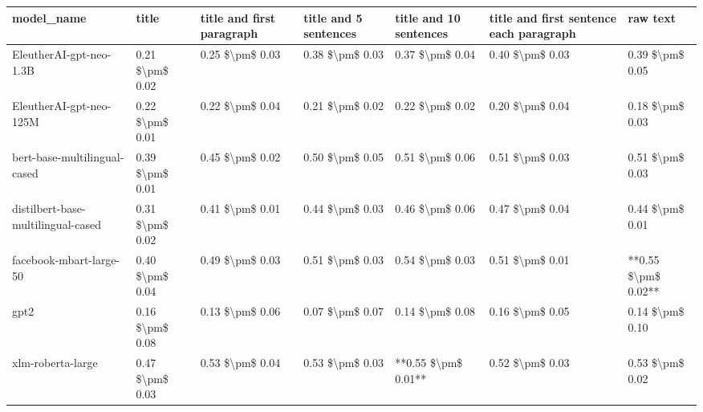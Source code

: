\begin{tabular}{lllllll}
\toprule
                        model\_name &           title & title and first paragraph & title and 5 sentences & title and 10 sentences & title and first sentence each paragraph &            raw text \\
\midrule
           EleutherAI-gpt-neo-1.3B & 0.21 \$\textbackslash pm\$ 0.02 &           0.25 \$\textbackslash pm\$ 0.03 &       0.38 \$\textbackslash pm\$ 0.03 &        0.37 \$\textbackslash pm\$ 0.04 &                         0.40 \$\textbackslash pm\$ 0.03 &     0.39 \$\textbackslash pm\$ 0.05 \\
           EleutherAI-gpt-neo-125M & 0.22 \$\textbackslash pm\$ 0.01 &           0.22 \$\textbackslash pm\$ 0.04 &       0.21 \$\textbackslash pm\$ 0.02 &        0.22 \$\textbackslash pm\$ 0.02 &                         0.20 \$\textbackslash pm\$ 0.04 &     0.18 \$\textbackslash pm\$ 0.03 \\
      bert-base-multilingual-cased & 0.39 \$\textbackslash pm\$ 0.01 &           0.45 \$\textbackslash pm\$ 0.02 &       0.50 \$\textbackslash pm\$ 0.05 &        0.51 \$\textbackslash pm\$ 0.06 &                         0.51 \$\textbackslash pm\$ 0.03 &     0.51 \$\textbackslash pm\$ 0.03 \\
distilbert-base-multilingual-cased & 0.31 \$\textbackslash pm\$ 0.02 &           0.41 \$\textbackslash pm\$ 0.01 &       0.44 \$\textbackslash pm\$ 0.03 &        0.46 \$\textbackslash pm\$ 0.06 &                         0.47 \$\textbackslash pm\$ 0.04 &     0.44 \$\textbackslash pm\$ 0.01 \\
           facebook-mbart-large-50 & 0.40 \$\textbackslash pm\$ 0.04 &           0.49 \$\textbackslash pm\$ 0.03 &       0.51 \$\textbackslash pm\$ 0.03 &        0.54 \$\textbackslash pm\$ 0.03 &                         0.51 \$\textbackslash pm\$ 0.01 & **0.55 \$\textbackslash pm\$ 0.02** \\
                              gpt2 & 0.16 \$\textbackslash pm\$ 0.08 &           0.13 \$\textbackslash pm\$ 0.06 &       0.07 \$\textbackslash pm\$ 0.07 &        0.14 \$\textbackslash pm\$ 0.08 &                         0.16 \$\textbackslash pm\$ 0.05 &     0.14 \$\textbackslash pm\$ 0.10 \\
                 xlm-roberta-large & 0.47 \$\textbackslash pm\$ 0.03 &           0.53 \$\textbackslash pm\$ 0.04 &       0.53 \$\textbackslash pm\$ 0.03 &    **0.55 \$\textbackslash pm\$ 0.01** &                         0.52 \$\textbackslash pm\$ 0.03 &     0.53 \$\textbackslash pm\$ 0.02 \\
\bottomrule
\end{tabular}
